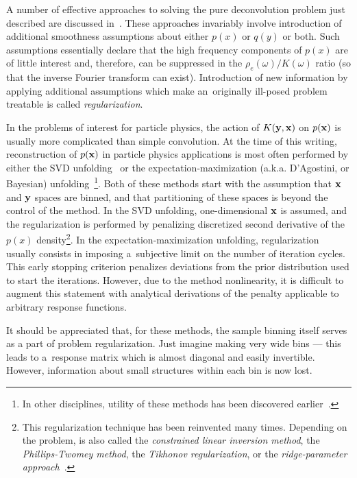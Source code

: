 \documentclass[12pt,titlepage]{article}
\begin{document}
A number of effective
approaches to solving the pure deconvolution problem just described
are discussed in~\cite{ref:deconvolutionbook}. These approaches invariably involve
introduction of additional smoothness assumptions about either
$p(x)$ or $q(y)$ or both. Such
assumptions essentially declare that the high frequency components of $p(x)$
are of little interest and, therefore, can be suppressed in the
$\rho_e(\omega)/K(\omega)$ ratio (so that the inverse Fourier transform
can exist). Introduction of new information by applying additional assumptions
which make an~originally ill-posed problem treatable is called
{\it regularization}.

In the problems of interest for particle physics, the action
of $K({\bf y}, {\bf x})$ on $p({\bf x})$ is usually more complicated than
simple convolution. At the time of this writing,
reconstruction of $p({\bf x})$ in particle physics applications is most often
performed by either the SVD unfolding~\cite{ref:svdunfold}
or the expectation-maximization
(a.k.a. D'Agostini, or Bayesian)
unfolding~\cite{ref:dagounfold}\footnote{In other disciplines,
utility of these methods has been discovered earlier~\cite{ref:unfoldingrev}.}.
Both of these methods start with the
assumption that ${\bf x}$ and ${\bf y}$ spaces are binned, and that
partitioning of these spaces is beyond the control of the method.
In the SVD unfolding, one-dimensional ${\bf x}$ is assumed, and the
regularization is performed by penalizing
discretized second derivative of the $p(x)$
density\footnote{This regularization technique has been reinvented
many times. Depending on the problem, is also called 
the {\it constrained linear inversion method},
the {\it Phillips-Twomey method}, the {\it Tikhonov regularization},
or the {\it ridge-parameter approach}~\cite{ref:numrecipes, ref:deconvolutionbook}.}. In the expectation-maximization
unfolding, regularization usually consists in imposing
a~subjective limit on the number of iteration cycles. This
early stopping criterion penalizes
deviations from the prior distribution used to start the iterations.
However, due to the method nonlinearity, it is difficult to
augment this statement with analytical derivations
of the penalty applicable to arbitrary response functions.

It should be appreciated that, for these methods,
the sample binning itself
serves as a part of problem regularization. Just imagine
making very wide bins --- this leads to a~response
matrix which is almost diagonal and easily invertible.
However, information about small structures within each bin
is now lost.
\end{document}

